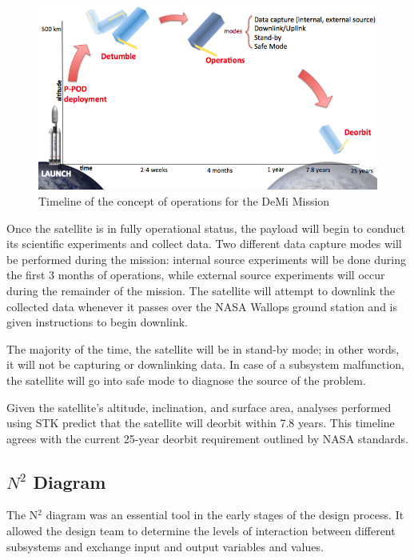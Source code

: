 \documentclass[12pt]{article}
\begin{document}
		
		\begin{figure}[!ht]
				\centering
				\includegraphics[width=5in]{images/MissionOverview_1.png}
				\caption{Timeline of the concept of operations for the DeMi Mission}
				\label{fig:Mission_ConOps}
			\end{figure}
		
		Once the satellite is in fully operational status, the payload will begin to conduct its scientific experiments and collect data. Two different data capture modes will be performed during the mission: internal source experiments will be done during the first 3 months of operations, while external source experiments will occur during the remainder of the mission. The satellite will attempt to downlink the collected data whenever it passes over the NASA Wallops ground station and is given instructions to begin downlink. 

The majority of the time, the satellite will be in stand-by mode; in other words, it will not be capturing or downlinking data. In case of a subsystem malfunction, the satellite will go into safe mode to diagnose the source of the problem. 

Given the satellite’s altitude, inclination, and surface area, analyses performed using STK predict that the satellite will deorbit within 7.8 years. This timeline agrees with the current 25-year deorbit requirement outlined by NASA standards.\cite{nasa-deorbit}


\subsection{$N^2$ Diagram}
		
		The N$^2$ diagram was an essential tool in the early stages of the design process. It allowed the design team to determine the levels of interaction between different subsystems and exchange input and output variables and values. 
		
\end{document}
